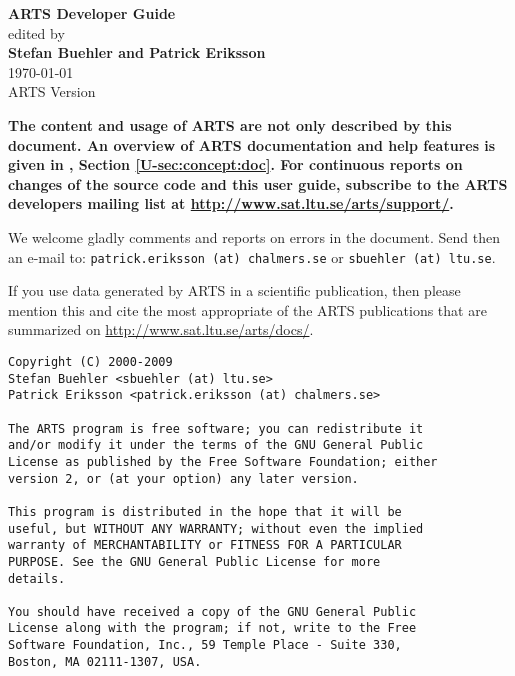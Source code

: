 \documentclass[11pt,twoside,a4paper,fleqn]{book}
\begin{document}
%
\renewcommand{\thepage}{title \arabic{page}} 

\thispagestyle{plain}
\begin{center}
  \vspace*{1cm}
  {\Huge \bf ARTS Developer Guide\\}
  \vspace*{1cm}
  {\large edited by \\}
  \vspace*{1cm}
  {\Large \bf Stefan Buehler and Patrick Eriksson}\\
   \vspace*{2cm}
   {\large \today\\
    ARTS Version 
   }
\end{center}
\vspace*{\fill}
{\normalsize \bf
  \noindent
  The content and usage of ARTS are not only described by this
  document. An overview of ARTS documentation and help features is
  given in \user, Section \ref{U-sec:concept:doc}. For continuous reports on
  changes of the source code and this user guide, subscribe to the
  ARTS developers mailing list at \url{http://www.sat.ltu.se/arts/support/}.

  We welcome gladly comments and reports on errors in the document.
  Send then an e-mail to: \verb|patrick.eriksson (at) chalmers.se| or 
  \verb|sbuehler (at) ltu.se|.

  If you use data generated by ARTS in a scientific
  publication, then please mention this and cite the most
  appropriate of the ARTS publications that are summarized on
  \url{http://www.sat.ltu.se/arts/docs/}.
}

\newpage                          
\thispagestyle{empty}
\vspace*{\fill}
\noindent
\begin{verbatim}
Copyright (C) 2000-2009
Stefan Buehler <sbuehler (at) ltu.se>
Patrick Eriksson <patrick.eriksson (at) chalmers.se>

The ARTS program is free software; you can redistribute it
and/or modify it under the terms of the GNU General Public
License as published by the Free Software Foundation; either
version 2, or (at your option) any later version.

This program is distributed in the hope that it will be
useful, but WITHOUT ANY WARRANTY; without even the implied
warranty of MERCHANTABILITY or FITNESS FOR A PARTICULAR
PURPOSE. See the GNU General Public License for more
details. 

You should have received a copy of the GNU General Public
License along with the program; if not, write to the Free
Software Foundation, Inc., 59 Temple Place - Suite 330,
Boston, MA 02111-1307, USA. 
\end{verbatim}
\end{document}
